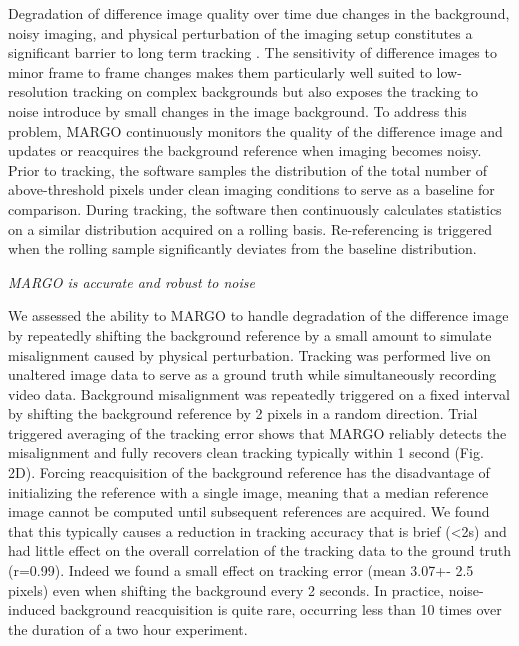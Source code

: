 \documentclass[10pt]{article}
\begin{document}
\begin{multicols}{2}
Degradation of difference image quality over time due changes in the background, noisy imaging, and physical perturbation of the imaging setup constitutes a significant barrier to long term tracking \cite{Sridhar_Tracktor_2018}. The sensitivity of difference images to minor frame to frame changes makes them particularly well suited to low-resolution tracking on complex backgrounds but also exposes the tracking to noise introduce by small changes in the image background. To address this problem, MARGO continuously monitors the quality of the difference image and updates or reacquires the background reference when imaging becomes noisy. Prior to tracking, the software samples the distribution of the total number of above-threshold pixels under clean imaging conditions to serve as a baseline for comparison.  During tracking, the software then continuously calculates statistics on a similar distribution acquired on a rolling basis.  Re-referencing is triggered when the rolling sample significantly deviates from the baseline distribution.

\textit{MARGO is accurate and robust to noise}

We assessed the ability to MARGO to handle degradation of the difference image by repeatedly shifting the background reference by a small amount to simulate misalignment caused by physical perturbation. Tracking was performed live on unaltered image data to serve as a ground truth while simultaneously recording video data. Background misalignment was repeatedly triggered on a fixed interval by shifting the background reference by 2 pixels in a random direction. Trial triggered averaging of the tracking error shows that MARGO reliably detects the misalignment and fully recovers clean tracking typically within 1 second (Fig. 2D). Forcing reacquisition of the background reference has the disadvantage of initializing the reference with a single image, meaning that a median reference image cannot be computed until subsequent references are acquired. We found that this typically causes a reduction in tracking accuracy that is brief (<2s) and had little effect on the overall correlation of the tracking data to the ground truth (r=0.99). Indeed we found a small effect on tracking error (mean 3.07+- 2.5 pixels) even when shifting the background every 2 seconds. In practice, noise-induced background reacquisition is quite rare, occurring less than 10 times over the duration of a two hour experiment.


\end{multicols}
\end{document}

